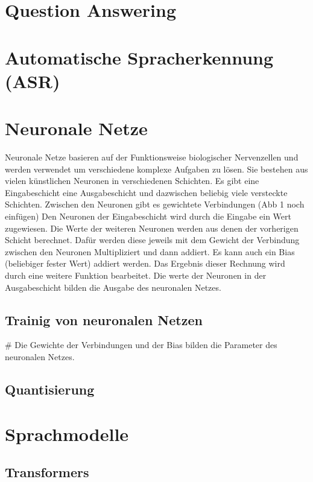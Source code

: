 
\section{Question Answering}

\section{Automatische Spracherkennung (ASR)}

\section{Neuronale Netze}
Neuronale Netze basieren auf der Funktionsweise biologischer Nervenzellen und werden verwendet um verschiedene komplexe Aufgaben zu lösen.
Sie bestehen aus vielen künstlichen Neuronen in verschiedenen Schichten.
Es gibt eine Eingabeschicht eine Ausgabeschicht und dazwischen beliebig viele versteckte Schichten.
Zwischen den Neuronen gibt es gewichtete Verbindungen (Abb 1 noch einfügen)
Den Neuronen der Eingabeschicht wird durch die Eingabe ein Wert zugewiesen.
Die Werte der weiteren Neuronen werden aus denen der vorherigen Schicht berechnet.
Dafür werden diese jeweils mit dem Gewicht der Verbindung zwischen den Neuronen Multipliziert und dann addiert.
Es kann auch ein Bias (beliebiger fester Wert) addiert werden.
Das Ergebnis dieser Rechnung wird durch eine weitere Funktion bearbeitet.
Die werte der Neuronen in der Ausgabeschicht bilden die Ausgabe des neuronalen Netzes.



\subsection{Trainig von neuronalen Netzen}#
Die Gewichte der Verbindungen und der Bias bilden die Parameter des neuronalen Netzes.


\subsection{Quantisierung}

\section{Sprachmodelle}
\subsection{Transformers}
